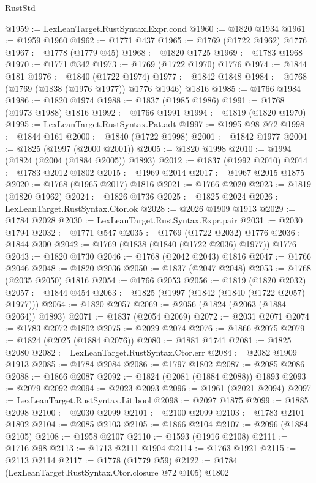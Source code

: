 \begin{lexlean}{RustStd}
\begin{coremodule}
@1959 := LexLeanTarget.RustSyntax.Expr.cond
@1960 := @1820 @1934
@1961 := @1959 @1960
@1962 := @1771 @437
@1965 := @1769 (@1722 @1962) @1776
@1967 := @1778 (@1779 @45)
@1968 := @1820 @1725
@1969 := @1783 @1968
@1970 := @1771 @342
@1973 := @1769 (@1722 @1970) @1776
@1974 := @1844 @181
@1976 := @1840 (@1722 @1974)
@1977 := @1842 @1848
@1984 := @1768 (@1769 (@1838 (@1976 @1977)) @1776 @1946) @1816
@1985 := @1766 @1984
@1986 := @1820 @1974
@1988 := @1837 (@1985 @1986)
@1991 := @1768 (@1973 @1988) @1816
@1992 := @1766 @1991
@1994 := @1819 (@1820 @1970)
@1995 := LexLeanTarget.RustSyntax.Pat.adt
@1997 := @1995 @98 @72
@1998 := @1844 @161
@2000 := @1840 (@1722 @1998)
@2001 := @1842 @1977
@2004 := @1825 (@1997 (@2000 @2001))
@2005 := @1820 @1998
@2010 := @1994 (@1824 (@2004 (@1884 @2005)) @1893)
@2012 := @1837 (@1992 @2010)
@2014 := @1783 @2012 @1802
@2015 := @1969 @2014
@2017 := @1967 @2015 @1875
@2020 := @1768 (@1965 @2017) @1816
@2021 := @1766 @2020
@2023 := @1819 (@1820 @1962)
@2024 := @1826 @1736
@2025 := @1825 @2024
@2026 := LexLeanTarget.RustSyntax.Ctor.ok
@2028 := @2026 @1909 @1913
@2029 := @1784 @2028
@2030 := LexLeanTarget.RustSyntax.Expr.pair
@2031 := @2030 @1794
@2032 := @1771 @547
@2035 := @1769 (@1722 @2032) @1776
@2036 := @1844 @300
@2042 := @1769 (@1838 (@1840 (@1722 @2036) @1977)) @1776
@2043 := @1820 @1730
@2046 := @1768 (@2042 @2043) @1816
@2047 := @1766 @2046
@2048 := @1820 @2036
@2050 := @1837 (@2047 @2048)
@2053 := @1768 (@2035 @2050) @1816
@2054 := @1766 @2053
@2056 := @1819 (@1820 @2032)
@2057 := @1844 @454
@2063 := @1825 (@1997 (@1842 (@1840 (@1722 @2057) @1977)))
@2064 := @1820 @2057
@2069 := @2056 (@1824 (@2063 (@1884 @2064)) @1893)
@2071 := @1837 (@2054 @2069)
@2072 := @2031 @2071
@2074 := @1783 @2072 @1802
@2075 := @2029 @2074
@2076 := @1866 @2075
@2079 := @1824 (@2025 (@1884 @2076))
@2080 := @1881 @1741
@2081 := @1825 @2080
@2082 := LexLeanTarget.RustSyntax.Ctor.err
@2084 := @2082 @1909 @1913
@2085 := @1784 @2084
@2086 := @1797 @1802
@2087 := @2085 @2086
@2088 := @1866 @2087
@2092 := @1824 (@2081 (@1884 @2088)) @1893
@2093 := @2079 @2092
@2094 := @2023 @2093
@2096 := @1961 (@2021 @2094)
@2097 := LexLeanTarget.RustSyntax.Lit.bool
@2098 := @2097 @1875
@2099 := @1885 @2098
@2100 := @2030 @2099
@2101 := @2100 @2099
@2103 := @1783 @2101 @1802
@2104 := @2085 @2103
@2105 := @1866 @2104
@2107 := @2096 (@1884 @2105)
@2108 := @1958 @2107
@2110 := @1593 (@1916 @2108)
@2111 := @1716 @98
@2113 := @1713 @2111 @1904
@2114 := @1763 @1921
@2115 := @2113 @2114
@2117 := @1778 (@1779 @59)
@2122 := @1784 (LexLeanTarget.RustSyntax.Ctor.closure @72 @105) @1802

\end{coremodule}
\end{lexlean}
